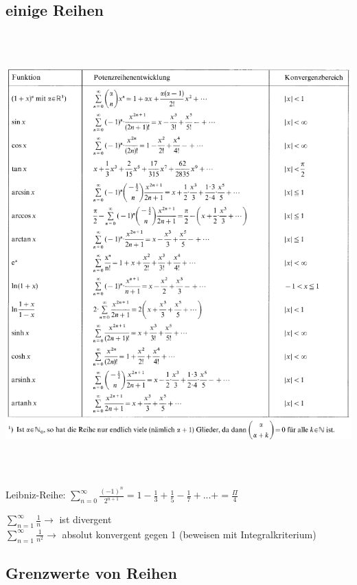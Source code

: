 \subsection{einige Reihen}

\includegraphics[height=17.0cm]{./bilder/reihen.png}

	Leibniz-Reihe: $ \sum\limits_{n=0}^{\infty} \frac{(-1)^n}{2^{n+1}} = 1-\frac{1}{3}+\frac{1}{5}-\frac{1}{7}+...+=\frac{\Pi}{4} $

	$\sum\limits_{n=1}^{\infty} \frac{1}{n} \rightarrow$ ist divergent \\
	$\sum\limits_{n=1}^{\infty} \frac{1}{n^2} \rightarrow$ absolut konvergent gegen 1 (beweisen mit Integralkriterium)

\subsection{Grenzwerte von Reihen}


